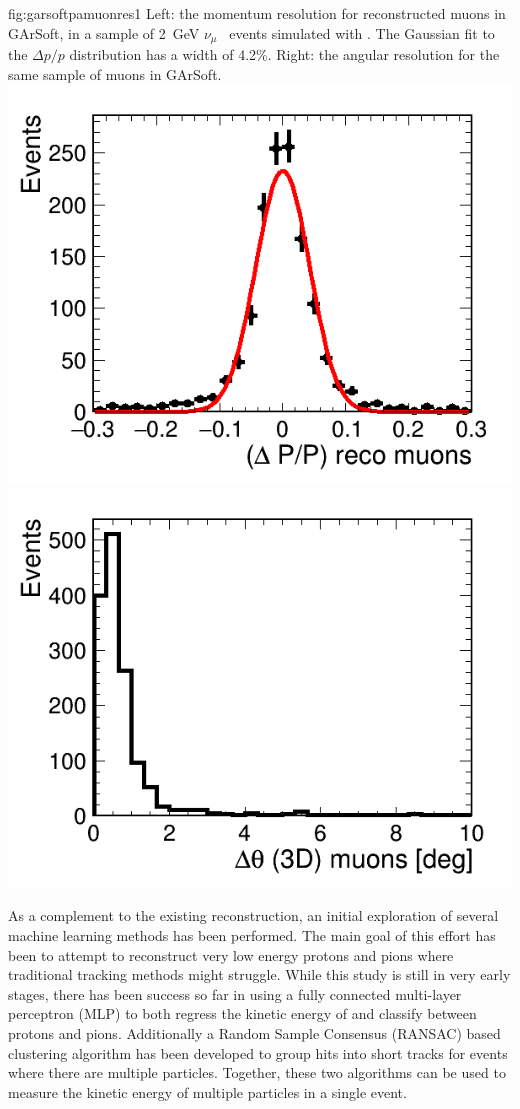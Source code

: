 \begin{dunefigure}{fig:garsoftpamuonres1}
{Left: the momentum resolution for reconstructed muons in GArSoft, in a sample of \SI{2}{GeV} $\nu_\mu$~ events simulated with .  The Gaussian fit to the $\Delta p/p$ distribution has a width of 4.2\%. Right:  the \threed angular resolution for the same sample of muons in GArSoft.}
\includegraphics[width=0.49\columnwidth]{graphics/dpmuon.png}\includegraphics[width=0.49\columnwidth]{graphics/anglediffmuon.png} 
\end{dunefigure}


\label{sec:TPC_ML}                                                     

As a complement to the existing reconstruction, an initial exploration of several machine learning methods has been performed.
The main goal of this effort has been to attempt to reconstruct very low energy protons and pions where traditional           
tracking methods might struggle.   
While this study is still in very early stages, there has been success so far in using a fully connected multi-layer perceptron (MLP) to both regress
the kinetic energy of and classify between protons and pions.  Additionally a Random Sample Consensus (RANSAC) based          
clustering algorithm has been developed to group hits into short tracks for events where there are multiple particles.        
Together, these two algorithms can be used to measure the kinetic energy of multiple particles in a single event.             

